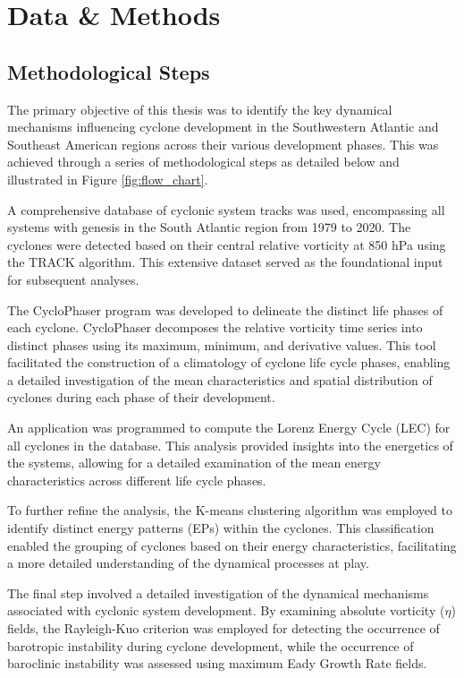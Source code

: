 \chapter{Data \& Methods}
\label{metodos}

\section{Methodological Steps}

The primary objective of this thesis was to identify the key dynamical mechanisms influencing cyclone development in the Southwestern Atlantic and Southeast American regions across their various development phases. This was achieved through a series of methodological steps as detailed below and illustrated in Figure \ref{fig:flow_chart}.

A comprehensive database of cyclonic system tracks was used, encompassing all systems with genesis in the South Atlantic region from 1979 to 2020. The cyclones were detected based on their central relative vorticity at 850 hPa using the TRACK algorithm. This extensive dataset served as the foundational input for subsequent analyses.

The CycloPhaser program was developed to delineate the distinct life phases of each cyclone. CycloPhaser decomposes the relative vorticity time series into distinct phases using its maximum, minimum, and derivative values. This tool facilitated the construction of a climatology of cyclone life cycle phases, enabling a detailed investigation of the mean characteristics and spatial distribution of cyclones during each phase of their development.

An application was programmed to compute the Lorenz Energy Cycle (LEC) for all cyclones in the database. This analysis provided insights into the energetics of the systems, allowing for a detailed examination of the mean energy characteristics across different life cycle phases.

To further refine the analysis, the K-means clustering algorithm was employed to identify distinct energy patterns (EPs) within the cyclones. This classification enabled the grouping of cyclones based on their energy characteristics, facilitating a more detailed understanding of the dynamical processes at play.

The final step involved a detailed investigation of the dynamical mechanisms associated with cyclonic system development. By examining absolute vorticity ($\eta$) fields, the Rayleigh-Kuo criterion was employed for detecting the occurrence of barotropic instability during cyclone development, while the occurrence of baroclinic instability was assessed using maximum Eady Growth Rate fields.

